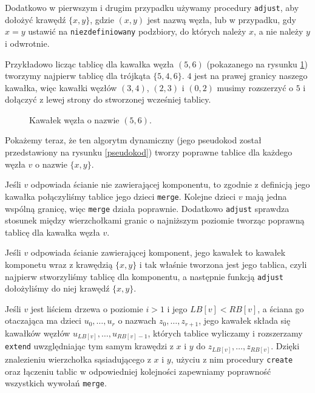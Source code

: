\documentclass[twoside,a4paper,12pt]{report} %
\theoremstyle{break}
\begin{document}
Dodatkowo w pierwszym i drugim przypadku używamy procedury \texttt{adjust}, aby dołożyć krawędź $\{x,y\}$, gdzie $(x,y)$ jest nazwą węzła, lub w przypadku, gdy $x=y$ ustawić na \texttt{niezdefiniowany} podzbiory, do których należy $x$, a nie należy $y$ i odwrotnie.

Przykładowo licząc tablicę dla kawałka węzła $(5,6)$ (pokazanego na rysunku \ref{(5,6) kawłek}) tworzymy najpierw tablicę dla trójkąta $\{5,4,6\}$. $4$ jest na prawej granicy naszego kawałka, więc kawałki węzłów $(3,4)$, $(2,3)$ i $(0,2)$ musimy rozszerzyć o $5$ i dołączyć z lewej strony do stworzonej wcześniej tablicy.

\begin{figure}[ht]
    \centering
    
    \caption{Kawałek węzła o nazwie $(5,6)$.}
    \label{(5,6) kawłek}
\end{figure}

Pokażemy teraz, że ten algorytm dynamiczny (jego pseudokod został przedstawiony na rysunku \ref{pseudokod}) tworzy poprawne tablice dla każdego węzła $v$ o nazwie $\{x,y\}$. 

Jeśli $v$ odpowiada ścianie nie zawierającej komponentu, to zgodnie z definicją jego kawałka połączyliśmy tablice jego dzieci \texttt{merge}. Kolejne dzieci $v$ mają jedna wspólną granicę, więc  \texttt{merge} działa poprawnie. Dodatkowo \texttt{adjust} sprawdza stosunek między wierzchołkami granic o najniższym poziomie tworząc poprawną tablicę dla kawałka węzła $v$.

Jeśli $v$ odpowiada ścianie zawierającej komponent, jego kawałek to kawałek komponetu wraz z krawędzią $\{x,y\}$ i tak właśnie tworzona jest jego tablica, czyli najpierw stworzyliśmy tablicę dla komponentu, a następnie funkcją \texttt{adjust} dołożyliśmy do niej krawędź $\{x,y\}$.

Jeśli $v$ jest liściem drzewa o poziomie $i > 1$ i jego $LB[v] < RB[v]$, a ściana go otaczająca ma dzieci $u_0,\dots,u_r$ o nazwach $z_0,\dots,z_{r+1}$, jego kawałek składa się kawałków węzłów $u_{LB[v]},\dots,u_{RB[v]-1}$, których tablice wyliczamy i rozszerzamy \texttt{extend} uwzględniając tym samym krawędzi z $x$ i $y$ do $z_{LB[v]},\dots,z_{RB[v]}$. Dzięki znalezieniu wierzchołka sąsiadującego z $x$ i $y$, użyciu z nim procedury \texttt{create} oraz łączeniu tablic w odpowiedniej kolejności zapewniamy poprawność wszystkich wywołań \texttt{merge}.
\end{document}
